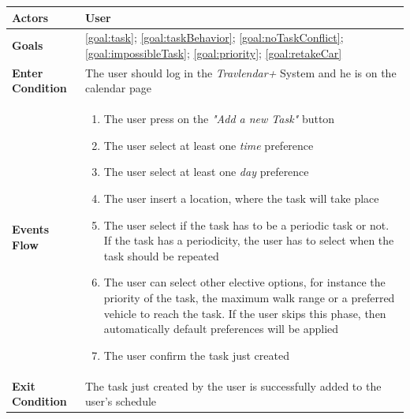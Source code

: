 \begin{table}[H]
	\centering
    
    \begin{tabular}{|p{3.5cm}|p{10.3cm}|}
    
    \hline
    \textbf{\large{Actors}}  			& \tabitem User\\
    
    \hline
    \textbf{\large{Goals}} 				& \ref{goal:task}; \ref{goal:taskBehavior}; \ref{goal:noTaskConflict}; \ref{goal:impossibleTask}; \ref{goal:priority}; \ref{goal:retakeCar}\\
    
    \hline
    \textbf{\large{Enter Condition}}	& The user should log in the \emph{Travlendar+} System and he 												is on the calendar page\\
    
    \hline
    \textbf{\large{Events Flow}}		& \begin{enumerate}[leftmargin=0.5cm]
                                          	\item The user press on the \emph{"Add a new Task"} button
                                            \item The user select at least one \emph{time} preference
                                            \item The user select at least one \emph{day} preference
                                            \item The user insert a location, where the task will take place
                                            \item The user select if the task has to be a periodic task 														or not. If the task has a periodicity, the user has to 															select when the task should be repeated
                                            \item The user can select other elective options, for instance the priority of the task, the maximum walk range or a preferred vehicle to reach the task. If the user skips this phase, then automatically default preferences will be applied
                                            \item The user confirm the task just created
                                          \end{enumerate}
    										\\
    \hline
    \textbf{\large{Exit Condition}} 	& The task just created by the user is successfully added to the user's 											schedule\\
    

\end{tabular}
\end{table}
